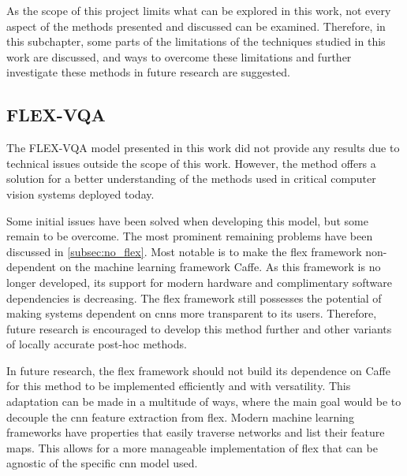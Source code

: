 \begin{comment}
    Your thesis will NOT answer everything. Still, it is important that you here show that you are aware of that and list various things that could be done to follow up on your work. What would be the next steps? Next experiments? Maybe link this up against section 1.3 - scope and limitations.
\end{comment}

As the scope of this project limits what can be explored in this work, not every aspect of the methods presented and discussed can be examined. Therefore, in this subchapter, some parts of the limitations of the techniques studied in this work are discussed, and ways to overcome these limitations and further investigate these methods in future research are suggested.

\subsection{FLEX-VQA}
    The FLEX-VQA model presented in this work did not provide any results due to technical issues outside the scope of this work. However, the method offers a solution for a better understanding of the methods used in critical computer vision systems deployed today.

    Some initial issues have been solved when developing this model, but some remain to be overcome. The most prominent remaining problems have been discussed in  \autoref{subsec:no_flex}. Most notable is to make the \gls{flex} framework non-dependent on the machine learning framework Caffe. As this framework is no longer developed, its support for modern hardware and complimentary software dependencies is decreasing. The \gls{flex} framework still possesses the potential of making systems dependent on \glspl{cnn} more transparent to its users. Therefore, future research is encouraged to develop this method further and other variants of locally accurate post-hoc methods. 

    In future research, the \gls{flex} framework should not build its dependence on Caffe for this method to be implemented efficiently and with versatility.
    This adaptation can be made in a multitude of ways, where the main goal would be to decouple the \gls{cnn} feature extraction from \gls{flex}. Modern machine learning frameworks have properties that easily traverse networks and list their feature maps. This allows for a more manageable implementation of \gls{flex} that can be agnostic of the specific \gls{cnn} model used. 


